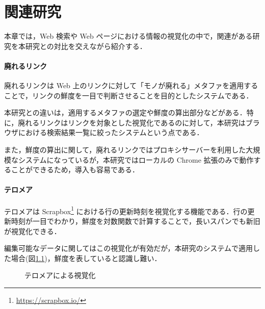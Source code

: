 \chapter{関連研究}
\label{chap:survey}

本章では，Web 検索や Web ページにおける情報の視覚化の中で，関連がある研究を本研究との対比を交えながら紹介する．

\newpage

\subsubsection{廃れるリンク}

廃れるリンク\cite{dyinglink}は Web 上のリンクに対して「モノが廃れる」メタファを適用することで，リンクの鮮度を一目で判断させることを目的としたシステムである．

本研究との違いは，適用するメタファの選定や鮮度の算出部分などがある．特に，廃れるリンクはリンクを対象とした視覚化であるのに対して，本研究はブラウザにおける検索結果一覧に絞ったシステムという点である．

また，鮮度の算出に関して，廃れるリンクではプロキシサーバーを利用した大規模なシステムになっているが，本研究ではローカルの Chrome 拡張のみで動作することができるため，導入も容易である．

\subsubsection{テロメア}

テロメア\cite{telomere}は Scrapbox\footnote{\url{https://scrapbox.io/}} における行の更新時刻を視覚化する機能である．行の更新時刻が一目でわかり，鮮度を対数関数で計算することで，長いスパンでも新旧が視覚化できる．

編集可能なデータに関してはこの視覚化が有効だが，本研究のシステムで適用した場合(図\ref{fig:ver-telomere})，鮮度を表していると認識し難い．

\begin{figure}[htbp]
  \begin{center}
  \end{center}
  \caption{テロメアによる視覚化}
  \label{fig:ver-telomere}
\end{figure}

